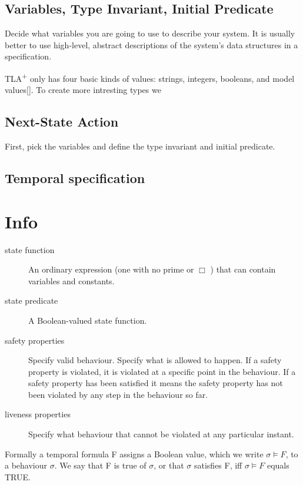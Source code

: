 \subsection{Variables, Type Invariant, Initial Predicate}

Decide what variables you are going to use to describe your system. It is usually
better to use high-level, abstract descriptions of the system’s data structures
in a specification.

TLA\textsuperscript{+} only has four basic kinds of values: strings, integers, 
booleans, and model values[]. To create more intresting types we 

\subsection{Next-State Action}
First, pick the variables and define the type invariant and initial predicate.
	
\subsection{Temporal specification}	

\section{Info}

\begin{description}
	\item [state function] An ordinary expression (one with no prime or \( \Box \) ) that can contain variables and constants.
	\item [state predicate] A Boolean-valued state function.
\end{description}

\begin{description}
	\item [safety properties] 	Specify valid behaviour. Specify what is allowed to happen. If a safety property is 
						violated, it is violated at a specific point in the behaviour. If a safety 
						property has been satisfied it means the safety property has not been
						violated by any step in the behaviour so far.
	\item [liveness properties]	Specify what behaviour that cannot be violated at any particular instant.
\end{description}

Formally a temporal formula F assigns a Boolean value, which we write \(  \sigma \vDash F \), to a behaviour \( \sigma \).
We say that F is true of \( \sigma \), or that \( \sigma \) satisfies F, iff \( \sigma \vDash F \) equals TRUE.

